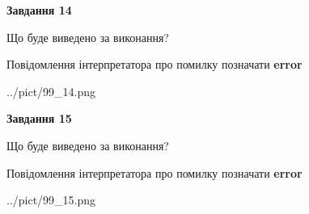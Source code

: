 \documentclass[11pt, ukrainian]{article}
\begin{document}
{\begin {large}
{\begin {center}\textbf{Завдання 14}\end {center}}\par
Що буде виведено за виконання? \par
Повідомлення інтерпретатора про помилку позначати \textbf{error}

\begin{center}
	{../pict/99_14.png}
\end{center}
\newpage

{\begin {center}\textbf{Завдання 15}\end {center}}\par
Що буде виведено за виконання? \par
Повідомлення інтерпретатора про помилку позначати \textbf{error}

\begin{center}
	{../pict/99_15.png}
\end{center}
\newpage

\end {large}}
\end{document}
